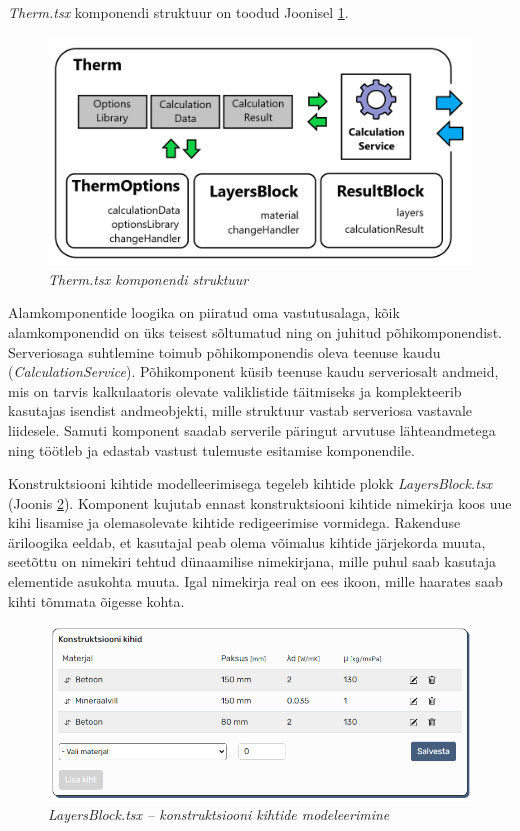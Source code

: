 \textit{Therm.tsx} komponendi struktuur on toodud Joonisel \ref{fig:development_frontend_therm}.
\begin{figure}[ht]
    \centering
    \includegraphics[width=.8\textwidth]{figures/development/frontend_term_structure.png}
    \caption[Kasutajaliidese komponendi \textit{Therm.tsx} struktuur]{\textit{Therm.tsx komponendi struktuur}}
    \label{fig:development_frontend_therm}
\end{figure}

Alamkomponentide loogika on piiratud oma vastutusalaga, kõik alamkomponendid on üks teisest sõltumatud ning on juhitud põhikomponendist. Serveriosaga suhtlemine toimub põhikomponendis
oleva teenuse kaudu (\textit{CalculationService}). Põhikomponent küsib teenuse kaudu serveriosalt andmeid, mis on tarvis kalkulaatoris olevate valiklistide täitmiseks ja komplekteerib
kasutajas isendist andmeobjekti, mille struktuur vastab serveriosa vastavale liidesele. Samuti komponent saadab serverile päringut arvutuse lähteandmetega ning 
töötleb ja edastab vastust tulemuste esitamise komponendile.

Konstruktsiooni kihtide modelleerimisega tegeleb kihtide plokk \textit{LayersBlock.tsx} (Joonis \ref{fig:dev_frontend_layersblock}). Komponent kujutab ennast konstruktsiooni kihtide
nimekirja koos uue kihi lisamise ja olemasolevate kihtide redigeerimise vormidega. Rakenduse äriloogika eeldab, et kasutajal peab olema võimalus kihtide järjekorda muuta, seetõttu
on nimekiri tehtud dünaamilise nimekirjana, mille puhul saab kasutaja elementide asukohta muuta. Igal nimekirja real on ees ikoon, mille haarates saab kihti tõmmata õigesse kohta. 


\begin{figure}[ht]
    \centering
    \includegraphics[width=1\textwidth]{figures/development/frontennd_layersblock.png}
    \caption[LayersBlock.tsx -- konstruktsiooni kihtide modeleerimine]{\textit{LayersBlock.tsx -- konstruktsiooni kihtide modeleerimine}}
    \label{fig:dev_frontend_layersblock}
\end{figure}


